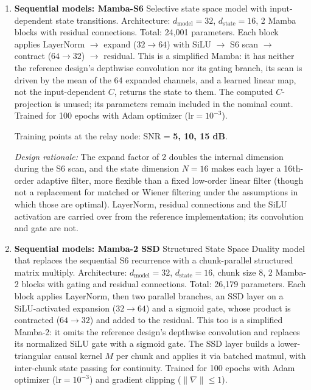 \begin{enumerate}
  \emph{Implementation:} A scalar-to-$d_{\text{model}}$ projection is followed by fixed sinusoidal positions and unmasked attention over all eleven samples. Each block has post-residual LayerNorm and a ReLU feedforward layer of width $2d_{\text{model}}$. Attention, feedforward and residual dropout use probability $0.1$ during training and are disabled during evaluation. The output reads the centre token. Unlike the two simplified Mamba scans, attention can use future samples.
\item  \textbf{Sequential models: Mamba-S6} Selective state space model with input-dependent state transitions. Architecture: \(d_{\text{model}}=32\), \(d_{\text{state}}=16\), 2 Mamba blocks with residual connections. Total: 24,001 parameters. Each block applies LayerNorm $\to$ expand (\(32 \to 64\)) with SiLU $\to$ S6 scan $\to$ contract (\(64 \to 32\)) $\to$ residual. This is a simplified Mamba: it has neither the reference design's depthwise convolution nor its gating branch, its scan is driven by the mean of the 64 expanded channels, and a learned linear map, not the input-dependent \(C\), returns the state to them. The computed \(C\)-projection is unused; its parameters remain included in the nominal count. Trained for 100 epochs with Adam optimizer (\(\text{lr}=10^{-3}\)).

  Training points at the relay node: SNR = \textbf{5, 10, 15 dB}.

  \emph{Design rationale:} The expand factor of 2 doubles the internal dimension during the S6 scan, and the state dimension $N=16$ makes each layer a 16th-order adaptive filter, more flexible than a fixed low-order linear filter (though not a replacement for matched or Wiener filtering under the assumptions in which those are optimal). LayerNorm, residual connections and the SiLU activation are carried over from the reference implementation; its convolution and gate are not.

\item \textbf{Sequential models: Mamba-2 SSD} Structured State Space Duality model that replaces the sequential S6 recurrence with a chunk-parallel structured matrix multiply. Architecture: \(d_{\text{model}}=32\), \(d_{\text{state}}=16\), chunk size 8, 2 Mamba-2 blocks with gating and residual connections. Total: 26,179 parameters. Each block applies LayerNorm, then two parallel branches, an SSD layer on a SiLU-activated expansion (\(32 \to 64\)) and a sigmoid gate, whose product is contracted (\(64 \to 32\)) and added to the residual. This too is a simplified Mamba-2: it omits the reference design's depthwise convolution and replaces its normalized SiLU gate with a sigmoid gate. The SSD layer builds a lower-triangular causal kernel \(M\) per chunk and applies it via batched matmul, with inter-chunk state passing for continuity. Trained for 100 epochs with Adam optimizer (\(\text{lr}=10^{-3}\)) and gradient clipping (\(\|\nabla\| \le 1\)).


\end{enumerate}
